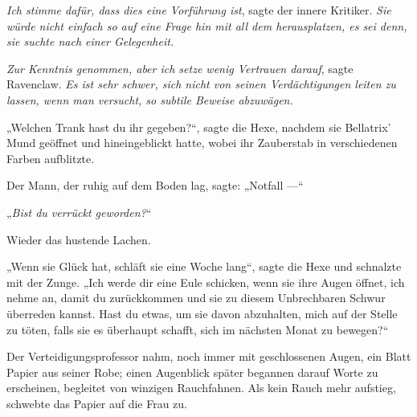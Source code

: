 \emph{Ich stimme dafür, dass dies eine Vorführung ist}, sagte der innere Kritiker. \emph{Sie würde nicht einfach so auf eine Frage hin mit all dem herausplatzen, es sei denn, sie suchte nach einer Gelegenheit.}

\emph{Zur Kenntnis genommen, aber ich setze wenig Vertrauen darauf}, sagte Ravenclaw. \emph{Es ist sehr schwer, sich nicht von seinen Verdächtigungen leiten zu lassen, wenn man versucht, so subtile Beweise abzuwägen.}

„Welchen Trank hast du ihr gegeben?“, sagte die Hexe, nachdem sie Bellatrix’ Mund geöffnet und hineingeblickt hatte, wobei ihr Zauberstab in verschiedenen Farben aufblitzte.

Der Mann, der ruhig auf dem Boden lag, sagte:
„Notfall —“

„\emph{Bist du verrückt geworden?}“

Wieder das hustende Lachen.

„Wenn sie Glück hat, schläft sie eine Woche lang“, sagte die Hexe und schnalzte mit der Zunge.
„Ich werde dir eine Eule schicken, wenn sie ihre Augen öffnet, ich nehme an, damit du zurückkommen und sie zu diesem Unbrechbaren Schwur überreden kannst. Hast du etwas, um sie davon abzuhalten, mich auf der Stelle zu töten, falls sie es überhaupt schafft, sich im nächsten Monat zu bewegen?“

Der Verteidigungsprofessor nahm, noch immer mit geschlossenen Augen, ein Blatt Papier aus seiner Robe; einen Augenblick später begannen darauf Worte zu erscheinen, begleitet von winzigen Rauchfahnen. Als kein Rauch mehr aufstieg, schwebte das Papier auf die Frau zu.

